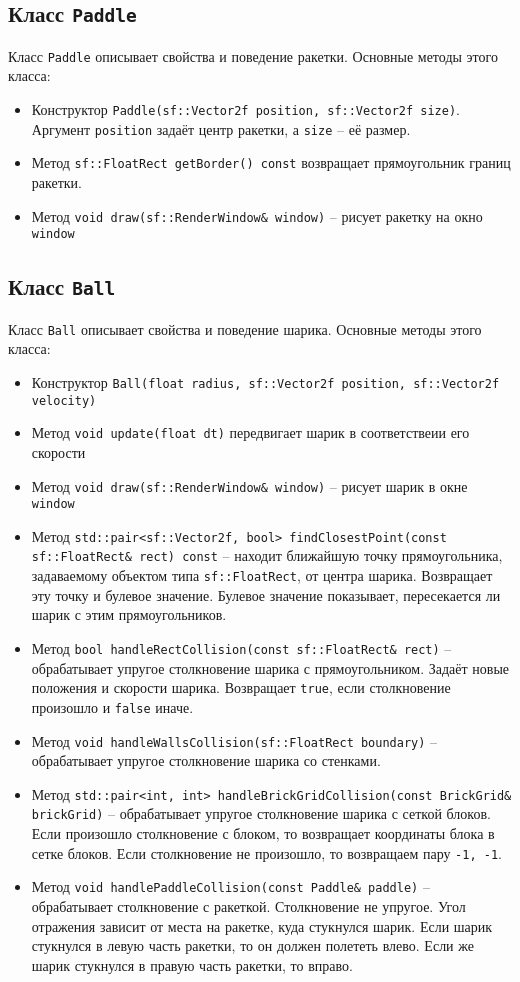 \documentclass{article}
\begin{document}
\subsection*{Класс \texttt{Paddle}}
Класс \texttt{Paddle} описывает свойства и поведение ракетки. Основные методы этого класса:
\begin{itemize}
\item Конструктор \texttt{Paddle(sf::Vector2f position, sf::Vector2f size)}. Аргумент  \texttt{position} задаёт центр ракетки, а \texttt{size} -- её размер.
\item Метод \texttt{sf::FloatRect getBorder() const} возвращает прямоугольник границ ракетки.
\item Метод \texttt{void draw(sf::RenderWindow\& window)} -- рисует ракетку на окно \texttt{window}
\end{itemize}

\subsection*{Класс \texttt{Ball}}
Класс \texttt{Ball} описывает свойства и поведение шарика. Основные методы этого класса:
\begin{itemize}
\item Конструктор \texttt{Ball(float radius, sf::Vector2f position, sf::Vector2f velocity)}
\item Метод \texttt{void update(float dt)} передвигает шарик в соответствеии его скорости
\item Метод \texttt{void draw(sf::RenderWindow\& window)} -- рисует шарик в окне \texttt{window}
\item Метод \texttt{std::pair<sf::Vector2f, bool> findClosestPoint(const sf::FloatRect\& rect) const} -- находит ближайшую точку прямоугольника, задаваемому объектом типа \texttt{sf::FloatRect}, от центра шарика. Возвращает эту точку и булевое значение. Булевое значение показывает, пересекается ли шарик с этим прямоугольников.
\item Метод \texttt{bool handleRectCollision(const sf::FloatRect\& rect)} -- обрабатывает упругое столкновение шарика с прямоугольником. Задаёт новые положения и скорости шарика. Возвращает \texttt{true}, если столкновение произошло и \texttt{false} иначе.

\item Метод \texttt{void handleWallsCollision(sf::FloatRect boundary)} -- обрабатывает упругое столкновение шарика со стенками.
\item Метод \texttt{std::pair<int, int> handleBrickGridCollision(const BrickGrid\& brickGrid)} -- обрабатывает упругое столкновение шарика с сеткой блоков. Если произошло столкновение с блоком, то возвращает координаты блока в сетке блоков. Если столкновение не произошло, то возвращаем пару \texttt{{-1, -1}}.
\item Метод \texttt{void handlePaddleCollision(const Paddle\& paddle)} -- обрабатывает столкновение с ракеткой. Столкновение не упругое. Угол отражения зависит от места на ракетке, куда стукнулся шарик. Если шарик стукнулся в левую часть ракетки, то он должен полететь влево. Если же шарик стукнулся в правую часть ракетки, то вправо.
\end{itemize}
\end{document}
